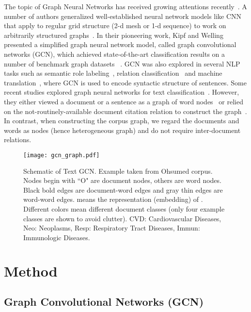 \documentclass[letterpaper]{article} \usepackage{aaai19}  \usepackage{times}  \usepackage{helvet}  \usepackage{courier}  \usepackage{url}  \usepackage{graphicx}  \frenchspacing  \usepackage{amsmath}
\begin{document}
The topic of Graph Neural Networks has received growing attentions recently~\cite{cai2018comprehensive,battaglia2018relational}. A number of authors generalized well-established neural network models like CNN that apply to regular grid structure (2-d mesh or 1-d sequence) to work on arbitrarily structured graphs~\cite{bruna2013spectral,henaff2015deep,defferrard2016convolutional,kipf2017semi}.
In their pioneering work, Kipf and Welling presented a simplified graph neural network model, called graph convolutional
networks (GCN), which achieved state-of-the-art classification results on a number of benchmark graph datasets ~\cite{kipf2017semi}.
GCN was also explored in several NLP tasks such as semantic role labeling~\cite{marcheggiani2017encoding}, relation classification~\cite{li2018gcrn} and machine translation~\cite{bastings2017graph}, where GCN is used to encode syntactic structure of sentences.
Some recent studies explored graph neural networks for text classification~\cite{henaff2015deep,defferrard2016convolutional,kipf2017semi,peng2018large,DBLP:conf/acl/ZhangLS18}. 
However, they either viewed a document or a sentence as a graph of word nodes~\cite{defferrard2016convolutional,peng2018large,DBLP:conf/acl/ZhangLS18} or relied on the not-routinely-available document citation relation to construct the graph~\cite{kipf2017semi}. In contrast, when constructing the corpus graph, we regard the documents and words as nodes (hence heterogeneous graph) and do not require inter-document relations.

\begin{figure*}[t]
  \centering
  \texttt{[image: gcn\_graph.pdf]}
  \caption{Schematic of Text GCN. Example taken from Ohsumed corpus. Nodes begin with ``O" are document nodes, others are word nodes. Black bold edges are document-word edges and gray thin edges are word-word edges.  means the representation (embedding) of . Different colors mean different document classes (only four example classes are shown to avoid clutter). CVD: Cardiovascular Diseases, Neo: Neoplasms, Resp: Respiratory Tract Diseases, Immun: Immunologic Diseases.}
  \label{fig:framework}
\end{figure*}

\section{Method}
\subsection{Graph Convolutional Networks (GCN)}
\end{document}
